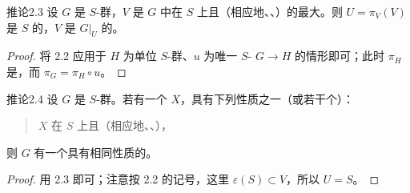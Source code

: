\begin{SGAresult}{推论}{2.3}
设 $G$ 是 $S$-群，$V$ 是 $G$ 中在 $S$ 上且（相应地、、）的最大。则 $U=\pi_V(V)$ 是 $S$ 的，$V$ 是 $G|_U$ 的。
\end{SGAresult}
\begin{proof}
将 2.2 应用于 $H$ 为单位 $S$-群、$u$ 为唯一 $S$- $G\to H$ 的情形即可；此时 $\pi_H$ 是，而 $\pi_G=\pi_H\circ u$。
\end{proof}
\begin{SGAresult}{推论}{2.4}
设 $G$ 是 $S$-群。若有一个 $X$，具有下列性质之一（或若干个）：
\begin{quote}
$X$ 在 $S$ 上且（相应地、、），
\end{quote}
则 $G$ 有一个具有相同性质的。
\end{SGAresult}
\begin{proof}
用 2.3 即可；注意按 2.2 的记号，这里 $\varepsilon(S)\subset V$，所以 $U=S$。
\end{proof}
